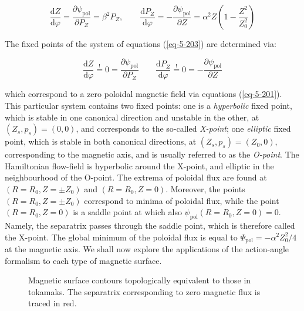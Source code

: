 \begin{equation}
    \label{eq-5-203}
    \frac{\mathrm{d}Z}{\mathrm{d}\varphi}=\frac{\partial\psi_\text{pol}}{\partial P_Z}=\beta^2P_Z,\qquad\frac{\mathrm{d}P_Z}{\mathrm{d}\varphi}=-\frac{\partial\psi_\text{pol}}{\partial Z}=\alpha^2Z\left(1-\frac{Z^2}{Z_0^2}\right)
\end{equation}

The fixed points of the system of equations (\ref{eq-5-203}) are determined via:

\begin{equation}
    \frac{\mathrm{d}Z}{\mathrm{d}\varphi}\stackrel{!}{=}0=\frac{\partial\psi_\text{pol}}{\partial P_Z}\qquad\frac{\mathrm{d}P_Z}{\mathrm{d}\varphi}\stackrel{!}{=}0=-\frac{\partial\psi_\text{pol}}{\partial Z}
\end{equation}

which correspond to a zero poloidal magnetic field via equations (\ref{eq-5-201}). This particular system contains two fixed points: one is a \textit{hyperbolic} fixed point, which is stable in one canonical direction and unstable in the other, at $(Z_s,p_s)=(0,0)$, and corresponds to the so-called \textit{X-point}; one \textit{elliptic} fixed point, which is stable in both canonical directions, at $(Z_s,p_s)=(Z_0,0)$, corresponding to the magnetic axis, and is usually referred to as the \textit{O-point}. The Hamiltonian flow-field is hyperbolic around the X-point, and elliptic in the neighbourhood of the O-point. The extrema of poloidal flux are found at $(R=R_0, Z=\pm Z_0)$ and $(R=R_0, Z=0)$. Moreover, the points $(R=R_0, Z=\pm Z_0)$ correspond to minima of poloidal flux, while the point $(R=R_0,Z=0)$ is a saddle point at which also $\psi_\text{pol}(R=R_0,Z=0)=0$. Namely, the separatrix passes through the saddle point, which is therefore called the X-point. The global minimum of the poloidal flux is equal to $\Psi_\text{pol}=-\alpha^2Z_0^2/4$ at the magnetic axis. We shall now explore the applications of the action-angle formalism to each type of magnetic surface.

\begin{figure}[H]
    \centering
    
    \captionsetup{justification=centering}
    \caption{Magnetic surface contours topologically equivalent to those in tokamaks. The separatrix corresponding to zero magnetic flux is traced in red.}
    \label{fig-5-4}
\end{figure}

